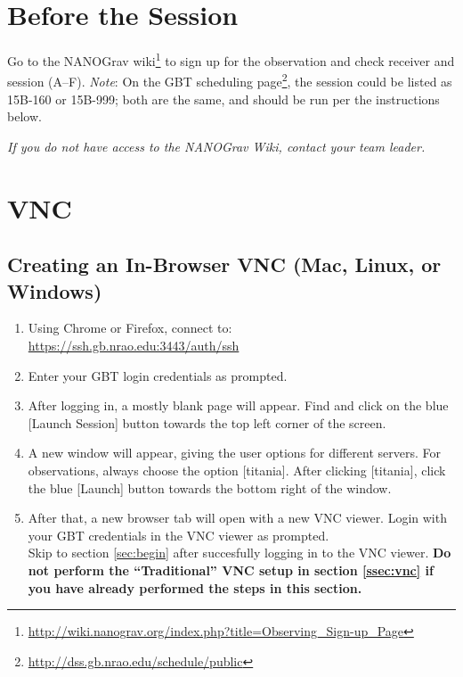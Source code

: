 \documentclass[11pt, reqno, tbtags]{article}
\begin{document}



\section{Before the Session} %
\label{sec:b4}

Go to the NANOGrav wiki\footnote{\url{http://wiki.nanograv.org/index.php?title=Observing_Sign-up_Page}}
to sign up for the observation and check receiver and session (A--F).                                                                               
\textit{Note}: On the GBT scheduling page\footnote{\url{http://dss.gb.nrao.edu/schedule/public}}, the session could be listed as 15B-160 or 15B-999; both are the same, and should be run per the instructions below. 

\textit{If you do not have access to the NANOGrav Wiki, contact your team leader.}



\section{VNC}\label{sec:vnc}  %

\subsection{Creating an In-Browser VNC (Mac, Linux, or Windows)}\label{ssec:newvnc}
\begin{enumerate}
 \item Using Chrome or Firefox, connect to:\\ \href{https://ssh.gb.nrao.edu:3443/auth/ssh}{https://ssh.gb.nrao.edu:3443/auth/ssh}
 \item Enter your GBT login credentials as prompted.
 \item After logging in, a mostly blank page will appear. Find and click on the blue [Launch Session] button towards the top left corner of the screen.
 \item A new window will appear, giving the user options for different servers. For observations, always choose the option [titania]. After clicking [titania], click the blue [Launch] button towards the bottom right of the window.
\item After that, a new browser tab will open with a new VNC viewer. Login with your GBT credentials in the VNC viewer as prompted.\\

Skip to section \ref{sec:begin} after succesfully logging in to the VNC viewer. {\bfseries {Do not perform the ``Traditional'' VNC setup in section \ref{ssec:vnc} if you have already performed the steps in this section.}}
\end{enumerate}
\end{document}
